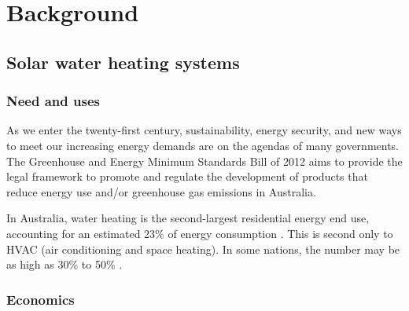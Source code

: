 \chapter{Background}

\section{Solar water heating systems}

\subsection{Need and uses}

As we enter the twenty-first century, sustainability, energy security, and new ways to meet our increasing energy demands are on the agendas of many governments.
The Greenhouse and Energy Minimum Standards Bill of 2012 \cite{} aims to provide the legal framework to promote and regulate the development of products that reduce energy use and/or greenhouse gas emissions in Australia.

In Australia, water heating is the second-largest residential energy end use, accounting for an estimated 23\% of energy consumption \cite{REMP12}.
This is second only to HVAC (air conditioning and space heating).
In some nations, the number may be as high as 30\% to 50\% \cite{Lane96}.

\subsection{Economics}

\section{}
